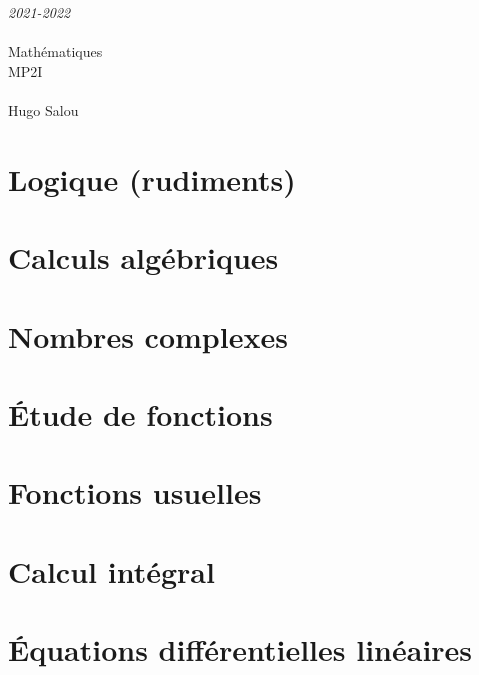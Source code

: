 \documentclass[a4paper]{report}
\newcommand{\chap}[2][0]{
	\setcounter{chapter}{#1 - 1}
	\chapter{#2}
	\renewcommand*\parttitle{#2}
}
\begin{document}
	\begin{titlepage}
		\begin{center}
			\vspace{10cm}
			{\Large \itshape 2021-2022}\\
			\vspace{3cm}
			\\
			\vspace{2mm}
			\vspace{0.5cm}
			{\HUGE Mathématiques}\\
			\vspace{0.5cm}
			{\fontsize{240pt}{260pt}\selectfont MP2I}\\
			\vspace{0.5cm}
			\\
			\vfill
			Hugo {\sc Salou}\\
		\end{center}
	\end{titlepage}

	{
		\lhead{}
		\renewcommand*\parttitle{Table des matières}
		\tableofcontents
	}



	\chap[00]{Logique (rudiments)}
	\renewcommand{\cwd}{../chap00}
	
	
	
	
	

	\chap[01]{Calculs algébriques}
	\renewcommand{\cwd}{../chap01}
	
	
	
	
	
	

	\chap[02]{Nombres complexes}
	\renewcommand{\cwd}{../chap02}
	
	
	
	
	

	\chap[03]{Étude de fonctions}
	\renewcommand{\cwd}{../chap03}
	
	
	

	\chap[04]{Fonctions usuelles}
	\renewcommand{\cwd}{../chap04}
	
	
	
	
	
	
	

	\chap[05]{Calcul intégral}
	\renewcommand{\cwd}{../chap05}
	

	\chap[06]{Équations différentielles linéaires}
	\renewcommand{\cwd}{../chap06}
	
	
	
\end{document}
